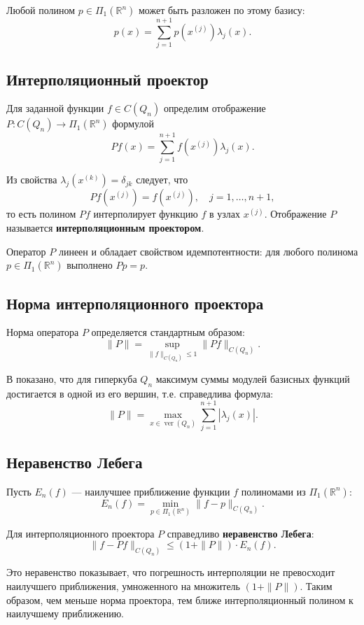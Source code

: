 \documentclass[a4paper,12pt]{article}
\theoremstyle{indented}
\begin{document}
Любой полином $p \in \Pi_1(\mathbb{R}^n)$ может быть разложен по этому базису:
\[
p(x) = \sum_{j=1}^{n+1} p(x^{(j)}) \lambda_j(x). \tag{1}
\]

\subsection{Интерполяционный проектор}

Для заданной функции $f \in C(Q_n)$ определим отображение $P: C(Q_n) \to \Pi_1(\mathbb{R}^n)$ формулой
\[
P f(x) = \sum_{j=1}^{n+1} f(x^{(j)}) \lambda_j(x). \tag{2}
\]

Из свойства $\lambda_j(x^{(k)}) = \delta_{jk}$ следует, что
\[
P f(x^{(j)}) = f(x^{(j)}), \quad j = 1, \dots, n+1,
\]
то есть полином $P f$ интерполирует функцию $f$ в узлах $x^{(j)}$. Отображение $P$ называется \textbf{интерполяционным проектором}.

Оператор $P$ линеен и обладает свойством идемпотентности: для любого полинома $p \in \Pi_1(\mathbb{R}^n)$ выполнено $P p = p$.

\subsection{Норма интерполяционного проектора}

Норма оператора $P$ определяется стандартным образом:
\[
\|P\| = \sup_{\|f\|_{C(Q_n)} \le 1} \|P f\|_{C(Q_n)}.
\]

В \cite{nevsky_geo} показано, что для гиперкуба $Q_n$ максимум суммы модулей базисных функций достигается в одной из его вершин, т.е. справедлива формула:
\[
\|P\| = \max_{x \in \operatorname{ver}(Q_n)} \sum_{j=1}^{n+1} |\lambda_j(x)|. \tag{3}
\]

\subsection{Неравенство Лебега}

Пусть $E_n(f)$ — наилучшее приближение функции $f$ полиномами из $\Pi_1(\mathbb{R}^n)$:
\[
E_n(f) = \min_{p \in \Pi_1(\mathbb{R}^n)} \|f - p\|_{C(Q_n)}.
\]

Для интерполяционного проектора $P$ справедливо \textbf{неравенство Лебега}:
\[
\|f - P f\|_{C(Q_n)} \le (1 + \|P\|) \cdot E_n(f). \tag{4}
\]

Это неравенство показывает, что погрешность интерполяции не превосходит наилучшего приближения, умноженного на множитель $(1 + \|P\|)$. Таким образом, чем меньше норма проектора, тем ближе интерполяционный полином к наилучшему приближению.
\end{document}
